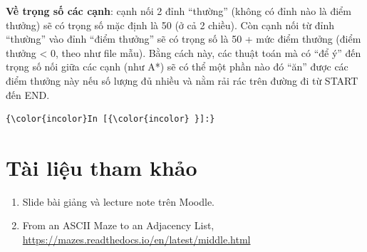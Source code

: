 \documentclass{report}
\providecommand{\tightlist}{%
      \setlength{\itemsep}{0pt}\setlength{\parskip}{0pt}}
\begin{document}
\textbf{Về trọng số các cạnh}: cạnh nối 2 đỉnh ``thường'' (không có đỉnh
nào là điểm thưởng) sẽ có trọng số mặc định là 50 (ở cả 2 chiều). Còn
cạnh nối từ đỉnh ``thường'' vào đỉnh ``điểm thưởng'' sẽ có trọng số là
50 + mức điểm thưởng (điểm thưởng \textless{} 0, theo như file mẫu).
Bằng cách này, các thuật toán mà có ``để ý'' đến trọng số nối giữa các
cạnh (như A*) sẽ có thể một phần nào đó ``ăn'' được các điểm thưởng này
nếu số lượng đủ nhiều và nằm rải rác trên đường đi từ START đến END.

    \begin{Verbatim}[commandchars=\\\{\},fontsize=\footnotesize]
{\color{incolor}In [{\color{incolor} }]:} 
\end{Verbatim}

\hypertarget{tuxe0i-liux1ec7u-tham-khux1ea3o}{%
\chapter{Tài liệu tham khảo}\label{tuxe0i-liux1ec7u-tham-khux1ea3o}}

\begin{enumerate}
\def\labelenumi{\arabic{enumi}.}
\tightlist
\item
  Slide bài giảng và lecture note trên Moodle.
\item
  From an ASCII Maze to an Adjacency List,
  \url{https://mazes.readthedocs.io/en/latest/middle.html}
\end{enumerate}


    
    
    
\end{document}
